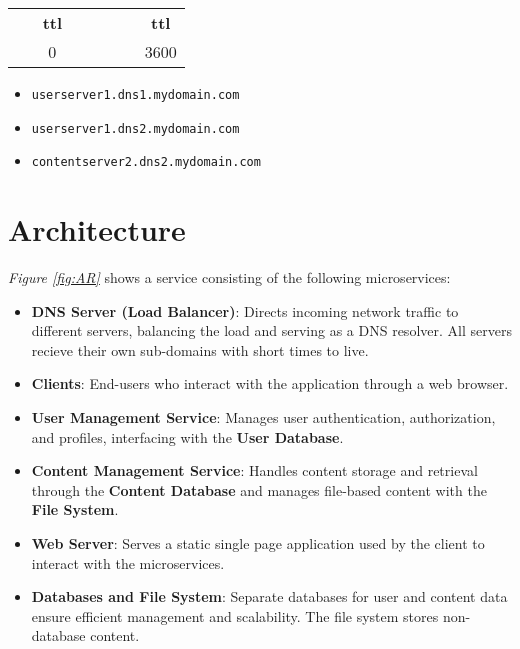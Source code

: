\documentclass[12pt]{article}
\begin{document}
\begin{tabular}{c c}
~ ~ \textbf{ttl} & ~ ~ ~ ~ ~ \textbf{ttl} \\
~ ~ 0 & ~ ~ ~ ~ ~ 3600 \\
\end{tabular}

    
\begin{itemize}
    \item \texttt{userserver1.dns1.mydomain.com}
    \item \texttt{userserver1.dns2.mydomain.com}
    \item \texttt{contentserver2.dns2.mydomain.com}
\end{itemize}


\section{Architecture}

\textit{Figure \ref{fig:AR}} shows a service consisting of the following microservices:

\begin{itemize}
    \item \textbf{DNS Server (Load Balancer)}: Directs incoming network traffic to different servers, 
    balancing the load and serving as a DNS resolver. All servers recieve their own sub-domains with short times to live.
    \item \textbf{Clients}: End-users who interact with the application through a web browser.
    \item \textbf{User Management Service}: Manages user authentication, authorization, and profiles, interfacing with the \textbf{User Database}.
    \item \textbf{Content Management Service}: Handles content storage and retrieval through the \textbf{Content Database} and manages file-based content with the \textbf{File System}.
    \item \textbf{Web Server}: Serves a static single page application used by the client to interact with the microservices.
    \item \textbf{Databases and File System}: Separate databases for user and content data ensure efficient management and scalability. The file system stores non-database content.
\end{itemize}
\end{document}
